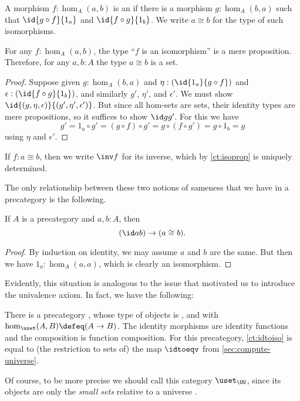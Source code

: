 \begin{defn}\label{ct:isomorphism}
  A morphism $f:\hom_A(a,b)$ is an 
  if there is a morphism $g:\hom_A(b,a)$ such that $\id{g\circ f}{1_a}$ and $\id{f\circ g}{1_b}$.
  We write $a\cong b$ for the type of such isomorphisms.
\end{defn}

\begin{lem}\label{ct:isoprop}
  For any $f:\hom_A(a,b)$, the type ``$f$ is an isomorphism'' is a mere proposition.
  Therefore, for any $a,b:A$ the type $a\cong b$ is a set.
\end{lem}
\begin{proof}
  Suppose given $g:\hom_A(b,a)$ and $\eta:(\id{1_a}{g\circ f})$ and $\epsilon:(\id{f\circ g}{1_b})$, and similarly $g'$, $\eta'$, and $\epsilon'$.
We must show $\id{(g,\eta,\epsilon)}{(g',\eta',\epsilon')}$.
  But since all hom-sets are sets, their identity types are mere propositions, so it suffices to show $\id g {g'}$.
  For this we have
  \[g' = 1_a\circ g' = (g\circ f)\circ g' = g\circ (f\circ g') = g\circ 1_b = g\]
  using $\eta$ and $\epsilon'$.
\end{proof}

%
If $f:a\cong b$, then we write $\inv f$ for its inverse, which by \cref{ct:isoprop} is uniquely determined.

The only relationship between these two notions of sameness that we have in a precategory is the following.

\begin{lem}\label{ct:idtoiso}
  If $A$ is a precategory and $a,b:A$, then
  \[(\id a b)\to (a \cong b).\]
\end{lem}
\begin{proof}
  By induction on identity, we may assume $a$ and $b$ are the same.
  But then we have $1_a:\hom_A(a,a)$, which is clearly an isomorphism.
\end{proof}

Evidently, this situation is analogous to the issue that motivated us to introduce the univalence axiom.
In fact, we have the following:

\begin{eg}\label{ct:precatset}
  There is a precategory \uset, whose type of objects is \set, and with $\hom_{\uset}(A,B) \defeq (A\to B)$.
  The identity morphisms are identity functions and the composition is function composition.
  For this precategory, \cref{ct:idtoiso} is equal to (the restriction to sets of) the map $\idtoeqv$ from \cref{sec:compute-universe}.

  Of course, to be more precise we should call this category $\uset_\UU$, since its objects are only the \emph{small sets}
  relative to a universe \UU.
\end{eg}


